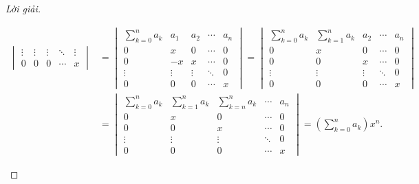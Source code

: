 \documentclass[class=linearalgebra,crop=false]{standalone}
\begin{document}
\begin{proof}[Lời giải]
\begin{enumerate}[label = (\alph*)]
\begin{align*}
\begin{vmatrix}
                    \vdots & \vdots & \vdots & \ddots & \vdots \\
                    0      & 0      & 0      & \cdots & x
                \end{vmatrix}
                & =
                \begin{vmatrix}
                    \sum^{n}_{k=0}a_{k} & a_{1}  & a_{2}  & \cdots & a_{n}  \\
                    0                   & x      & 0      & \cdots & 0      \\
                    0                   & -x     & x      & \cdots & 0      \\
                    \vdots              & \vdots & \vdots & \ddots & 0      \\
                    0                   & 0      & 0      & \cdots & x
                \end{vmatrix}
                =
                \begin{vmatrix}
                    \sum^{n}_{k=0}a_{k} & \sum^{n}_{k=1}a_{k} & a_{2}  & \cdots & a_{n}  \\
                    0                   & x                   & 0      & \cdots & 0      \\
                    0                   & 0                   & x      & \cdots & 0      \\
                    \vdots              & \vdots              & \vdots & \ddots & 0      \\
                    0                   & 0                   & 0      & \cdots & x
                \end{vmatrix} \\
                & = 
                \begin{vmatrix}
                    \sum^{n}_{k=0}a_{k} & \sum^{n}_{k=1}a_{k} & \sum^{n}_{k=n}a_{k} & \cdots & a_{n}  \\
                    0                   & x                   & 0                   & \cdots & 0      \\
                    0                   & 0                   & x                   & \cdots & 0      \\
                    \vdots              & \vdots              & \vdots              & \ddots & 0      \\
                    0                   & 0                   & 0                   & \cdots & x
                \end{vmatrix}
                = \left(\sum^{n}_{k=0}a_{k}\right)x^{n}.

\end{align*}
\end{enumerate}
\end{proof}
\end{document}
